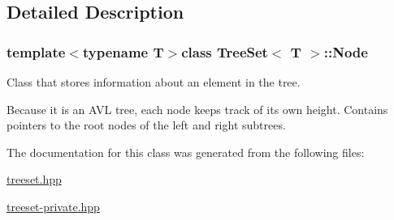\subsection{Detailed Description}
\subsubsection*{template$<$typename T$>$class Tree\-Set$<$ T $>$\-::\-Node}

Class that stores information about an element in the tree. 

Because it is an A\-V\-L tree, each node keeps track of its own height. Contains pointers to the root nodes of the left and right subtrees. 

The documentation for this class was generated from the following files\-:\begin{DoxyCompactItemize}
\item 
\hyperlink{treeset_8hpp}{treeset.\-hpp}\item 
\hyperlink{treeset-private_8hpp}{treeset-\/private.\-hpp}\end{DoxyCompactItemize}
